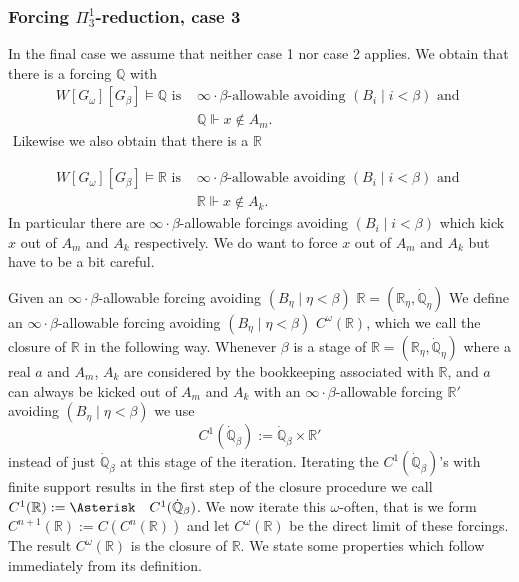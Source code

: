 \documentclass[a4paper,11pt]{article}
\newcommand{\forceQ}{\mathbb{Q}}
\newcommand{\forceR}{\mathbb{R}}
\begin{document}
\subsubsection{Forcing \texorpdfstring{$\Pi^1_3$}{Pi13}-reduction, case 3}

 In the final case we assume that  neither case 1 nor case 2 applies. We obtain that  there is a  forcing $\forceQ$ with
    ﻿
    \begin{align*}
    W[G_{\omega}] [G_{\beta}] \models \forceQ \text{ is } &\infty \cdot \beta \text{-allowable avoiding $(B_i \mid i <\beta)$ and } \\& \forceQ \Vdash x \notin A_m.
    \end{align*}
    ﻿
    Likewise we also obtain that  there is a $\forceR$
    
    \begin{align*}
    W[G_{\omega}][G_{\beta}] \models   \forceR \text{ is }& \infty \cdot \beta \text{-allowable avoiding $(B_i \mid i <\beta)$ and } \\&  \forceR \Vdash x \notin A_k.
    \end{align*}
    ﻿In particular there are $\infty \cdot \beta $-allowable forcings avoiding $(B_i \mid i < \beta)$ which kick $x$ out of $A_m$ and $A_k$ respectively. We do want to force $x$ out of $A_m$ and $A_k$ but have to be a bit careful. 

Given an $\infty \cdot \beta$-allowable forcing avoiding $(B_{\eta} \mid \eta < \beta)$  $\forceR= (\forceR_{\eta}, \dot{\forceQ}_{\eta})$
We define an $\infty \cdot \beta$-allowable forcing avoiding $(B_{\eta} \mid \eta < \beta)$ $C^{\omega} (\forceR)$, which we call the closure of $\forceR$ in the following way. Whenever $\beta$ is a stage of $\forceR= (\forceR_{\eta}, \dot{\forceQ}_{\eta})$ where a real $a$ and $A_m$, $A_k$ are considered by the bookkeeping associated with $\forceR$, and $a$ can always be kicked out of $A_m$ and $A_k$ with an $\infty \cdot \beta$-allowable forcing $\forceR'$ avoiding $(B_{\eta} \mid \eta < \beta)$ we use 
\[C^1(\dot{\forceQ}_{\beta}):=  \dot{\forceQ}_{\beta} \times\mathbb{R'}  \] 
instead of just $\dot{\forceQ}_{\beta}$ at this stage of the iteration. Iterating the $C^1(\dot{\forceQ}_{\beta})$'s with finite support results in  the first step of the closure procedure we call $C^1(\forceR):= \Asterisk \quad C^1(\dot{\forceQ}_{\beta} ) $. We now iterate this $\omega$-often, that is we form $C^{n+1}(\forceR):= C(C^n(\forceR))$ and let $C^{\omega} (\forceR)$ be the direct limit of these forcings.
The result $C^{\omega} (\forceR)$ is the closure of $\forceR$. We state some properties which follow immediately from its definition.
\end{document}
